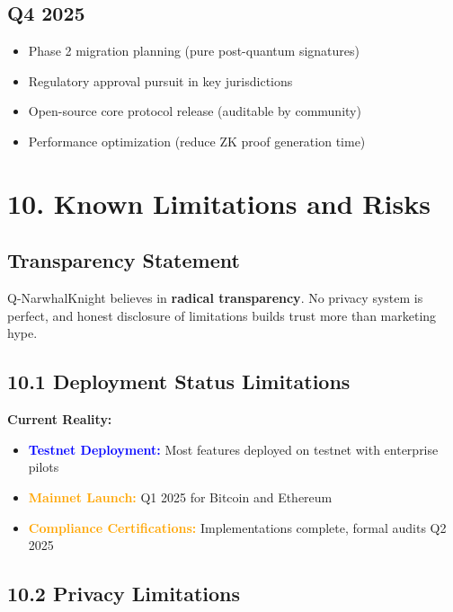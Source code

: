 \documentclass[11pt,a4paper]{article}
\begin{document}
\subsection{Q4 2025}
\begin{itemize}
    \item Phase 2 migration planning (pure post-quantum signatures)
    \item Regulatory approval pursuit in key jurisdictions
    \item Open-source core protocol release (auditable by community)
    \item Performance optimization (reduce ZK proof generation time)
\end{itemize}

\section{10. Known Limitations and Risks}

\subsection{Transparency Statement}

Q-NarwhalKnight believes in \textbf{radical transparency}. No privacy system is perfect, and honest disclosure of limitations builds trust more than marketing hype.

\subsection{10.1 Deployment Status Limitations}

\textbf{Current Reality:}
\begin{itemize}
    \item \textcolor{blue}{\textbf{Testnet Deployment:}} Most features deployed on testnet with enterprise pilots
    \item \textcolor{orange}{\textbf{Mainnet Launch:}} Q1 2025 for Bitcoin and Ethereum
    \item \textcolor{orange}{\textbf{Compliance Certifications:}} Implementations complete, formal audits Q2 2025
\end{itemize}

\subsection{10.2 Privacy Limitations}
\end{document}

